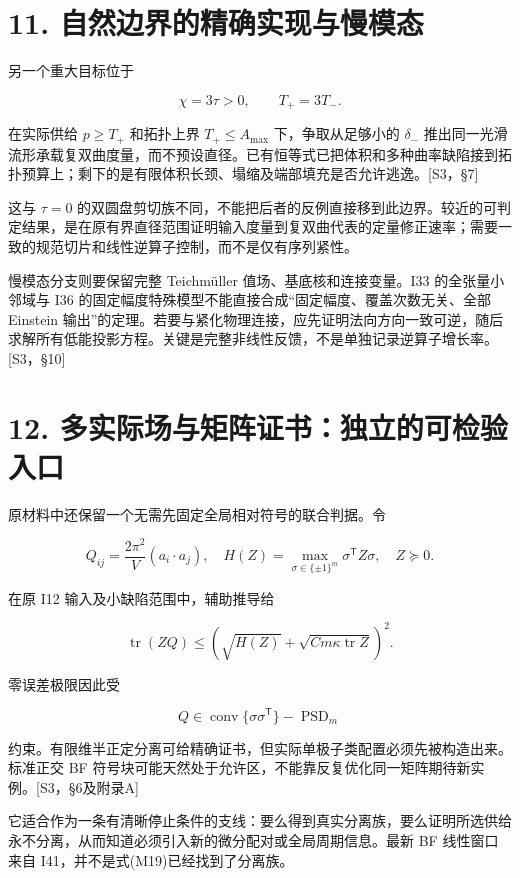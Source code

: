 \documentclass[UTF8,a4paper,11pt,fontset=fandol]{ctexart}
\begin{document}
\section{11.
自然边界的精确实现与慢模态}\label{ux81eaux7136ux8fb9ux754cux7684ux7cbeux786eux5b9eux73b0ux4e0eux6162ux6a21ux6001}

另一个重大目标位于

\[
\chi=3\tau>0,\qquad T_+=3T_-.
\]

在实际供给 \(p\ge T_+\) 和拓扑上界 \(T_+\le A_{\max}\)
下，争取从足够小的 \(\delta_-\)
推出同一光滑流形承载复双曲度量，而不预设直径。已有恒等式已把体积和多种曲率缺陷接到拓扑预算上；剩下的是有限体积长颈、塌缩及端部填充是否允许逃逸。{[}S3，§7{]}

这与 \(\tau=0\)
的双圆盘剪切族不同，不能把后者的反例直接移到此边界。较近的可判定结果，是在原有界直径范围证明输入度量到复双曲代表的定量修正速率；需要一致的规范切片和线性逆算子控制，而不是仅有序列紧性。

慢模态分支则要保留完整 Teichmüller 值场、基底核和连接变量。I33
的全张量小邻域与 I36
的固定幅度特殊模型不能直接合成``固定幅度、覆盖次数无关、全部 Einstein
输出''的定理。若要与紧化物理连接，应先证明法向方向一致可逆，随后求解所有低能投影方程。关键是完整非线性反馈，不是单独记录逆算子增长率。{[}S3，§10{]}

\section{12.
多实际场与矩阵证书：独立的可检验入口}\label{ux591aux5b9eux9645ux573aux4e0eux77e9ux9635ux8bc1ux4e66ux72ecux7acbux7684ux53efux68c0ux9a8cux5165ux53e3}

原材料中还保留一个无需先固定全局相对符号的联合判据。令

\[
Q_{ij}=\frac{2\pi^2}{V}(a_i\cdot a_j),\quad
H(Z)=\max_{\sigma\in\{\pm1\}^m}\sigma^{\mathsf T}Z\sigma,
\quad Z\succeq0.
\]

在原 I12 输入及小缺陷范围中，辅助推导给

\[
\operatorname{tr}(ZQ)
\le\left(\sqrt{H(Z)}+
\sqrt{Cm\kappa\operatorname{tr}Z}\right)^2.
\tag{M19}
\]

零误差极限因此受

\[
Q\in\operatorname{conv}\{\sigma\sigma^{\mathsf T}\}
-\operatorname{PSD}_m
\]

约束。有限维半正定分离可给精确证书，但实际单极子类配置必须先被构造出来。标准正交
BF
符号块可能天然处于允许区，不能靠反复优化同一矩阵期待新实例。{[}S3，§6及附录A{]}

它适合作为一条有清晰停止条件的支线：要么得到真实分离族，要么证明所选供给永不分离，从而知道必须引入新的微分配对或全局周期信息。最新
BF 线性窗口来自 I41，并不是式(M19)已经找到了分离族。
\end{document}

